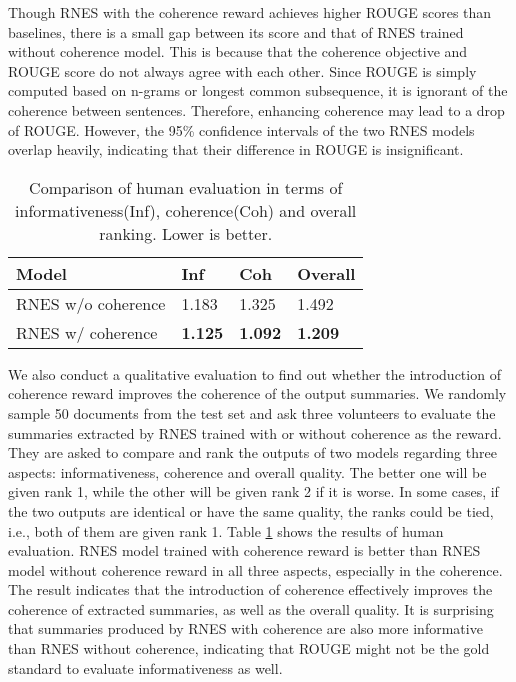 \documentclass[letterpaper]{article} \usepackage{aaai18}  \usepackage{times}  \usepackage{helvet}  \usepackage{courier}  \usepackage{url}  \usepackage{graphicx}  \usepackage{amssymb}
\begin{document}
	Though RNES with the coherence reward achieves higher ROUGE scores than baselines, there is a small gap between its score and that of RNES trained without coherence model. This is because that the coherence objective and ROUGE score do not always agree with each other. Since ROUGE is simply computed based on n-grams or longest common subsequence, it is ignorant of the coherence between sentences. Therefore, enhancing coherence may lead to a drop of ROUGE. However, the 95\% confidence intervals of the two RNES models overlap heavily, indicating that their difference in ROUGE is insignificant.
	

	\begin{table}[ht]
	\centering
	\caption{Comparison of human evaluation in terms of informativeness(Inf), coherence(Coh) and overall ranking. Lower is better.}
	\label{tab:human_eval}
	
	\begin{tabular}{|p{31mm}|p{12mm}|p{12mm}|p{12mm}|}
		\hline
		Model&Inf&Coh&Overall\\\hline
		RNES w/o coherence&1.183&1.325&1.492 \\
		RNES w/ coherence& \textbf{1.125} & \textbf{1.092} & \textbf{1.209} \\\hline
	\end{tabular}
	\end{table}	
  

	We also conduct a qualitative evaluation to find out whether the introduction of coherence reward improves the coherence of the output summaries. We randomly sample 50 documents from the test set and ask three volunteers to evaluate the summaries extracted by RNES trained with or without coherence as the reward. They are asked to compare and rank the outputs of two models regarding three aspects: informativeness, coherence and overall quality. The better one will be given rank 1, while the other will be given rank 2 if it is worse. In some cases, if the two outputs are identical or have the same quality, the ranks could be tied, i.e., both of them are given rank 1. Table \ref{tab:human_eval} shows the results of human evaluation. RNES model trained with coherence reward is better than RNES model without coherence reward in all three aspects, especially in the coherence. The result indicates that the introduction of coherence effectively improves the coherence of extracted summaries, as well as the overall quality. It is surprising that summaries produced by RNES with coherence are also more informative than RNES without coherence, indicating that ROUGE might not be the gold standard to evaluate informativeness as well. 
	
\end{document}
